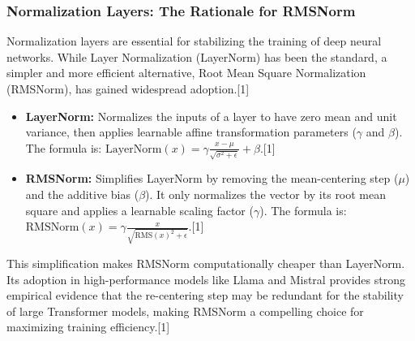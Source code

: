 \documentclass[12pt, a4paper]{article}
\begin{document}
\subsubsection{Normalization Layers: The Rationale for RMSNorm}

Normalization layers are essential for stabilizing the training of deep neural networks. While Layer Normalization (LayerNorm) has been the standard, a simpler and more efficient alternative, Root Mean Square Normalization (RMSNorm), has gained widespread adoption.[1]

\begin{itemize}
    \item \textbf{LayerNorm:} Normalizes the inputs of a layer to have zero mean and unit variance, then applies learnable affine transformation parameters ($\gamma$ and $\beta$). The formula is: $\text{LayerNorm}(x) = \gamma \frac{x - \mu}{\sqrt{\sigma^2 + \epsilon}} + \beta$.[1]
    \item \textbf{RMSNorm:} Simplifies LayerNorm by removing the mean-centering step ($\mu$) and the additive bias ($\beta$). It only normalizes the vector by its root mean square and applies a learnable scaling factor ($\gamma$). The formula is: $\text{RMSNorm}(x) = \gamma \frac{x}{\sqrt{\text{RMS}(x)^2 + \epsilon}}$.[1]
\end{itemize}

This simplification makes RMSNorm computationally cheaper than LayerNorm. Its adoption in high-performance models like Llama and Mistral provides strong empirical evidence that the re-centering step may be redundant for the stability of large Transformer models, making RMSNorm a compelling choice for maximizing training efficiency.[1]

\begin{table}[h!]
\centering
\caption{Comparison of Normalization Layers}
\label{tab:norm_layers}
\end{table}
\end{document}
